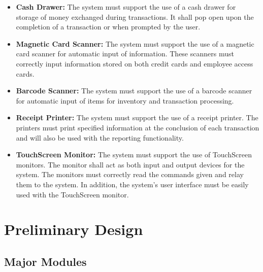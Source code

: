 \documentclass{report}
\begin{document}
            \begin{itemize}
                \item {\bf Cash Drawer:} The system must support the use of a
                cash drawer for storage of money exchanged during transactions.
                It shall pop open upon the completion of a transaction or when
                prompted by the user.

                \item {\bf Magnetic Card Scanner:} The system must support the use
                of a magnetic card scanner for automatic input of information.  These
                scanners must correctly input information stored on both credit cards
                and employee access cards.

                \item {\bf Barcode Scanner:} The system must support the use of
                a barcode scanner for automatic input of items for inventory
                and transaction processing.

                \item {\bf Receipt Printer:} The system must support the use of
                a receipt printer.  The printers must print specified information
                at the conclusion of each transaction and will also be used with
                the reporting functionality.

                \item {\bf TouchScreen Monitor:} The system must support the use
                of TouchScreen monitors.  The monitor shall act as both input and
                output devices for the system.  The monitors must correctly read
                the commands given and relay them to the system.
                In addition, the system's user interface must be
                easily used with the TouchScreen monitor.
            \end{itemize}


    \section{Preliminary Design}

        \subsection{Major Modules}
\end{document}
